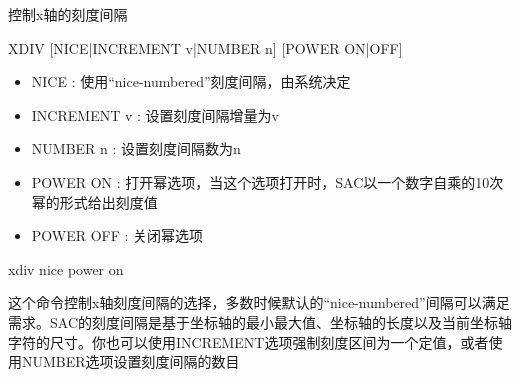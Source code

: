 \label{cmd:xdiv}

控制x轴的刻度间隔

\begin{SACSTX}
XDIV [NICE|INCREMENT v|NUMBER n] [POWER ON|OFF]
\end{SACSTX}

\begin{itemize}
\item NICE : 使用``nice-numbered''刻度间隔，由系统决定 
\item INCREMENT v : 设置刻度间隔增量为v  
\item NUMBER n : 设置刻度间隔数为n  
\item POWER ON : 打开幂选项，当这个选项打开时，SAC以一个数字自乘的10次幂的形式给出刻度值 
\item POWER OFF : 关闭幂选项 
\end{itemize}

\begin{SACDFT}
xdiv nice power on
\end{SACDFT}

这个命令控制x轴刻度间隔的选择，多数时候默认的``nice-numbered''间隔可以满足需求。SAC的刻度间隔是基于坐标轴的最小最大值、坐标轴的长度以及当前坐标轴字符的尺寸。你也可以使用INCREMENT选项强制刻度区间为一个定值，或者使用NUMBER选项设置刻度间隔的数目
